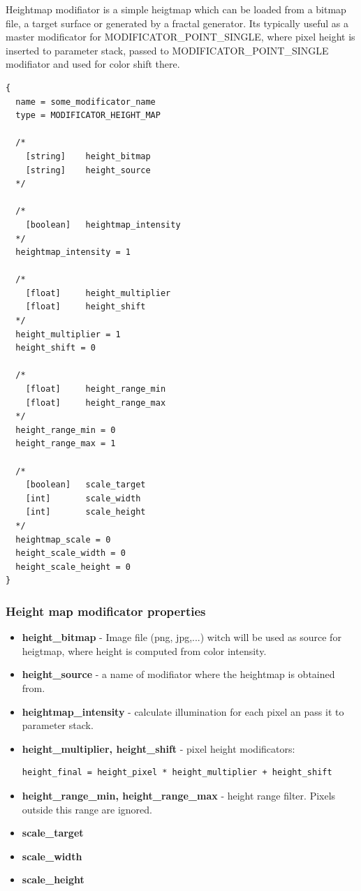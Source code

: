 \documentclass[9pt]{article}
\begin{document}
Heightmap modifiator is a simple heigtmap which can be loaded from a bitmap
file, a target surface or generated by a fractal generator. Its typically useful
as a master modificator for MODIFICATOR\_POINT\_SINGLE, where pixel height
is inserted to parameter stack, passed to MODIFICATOR\_POINT\_SINGLE modifiator
and used for color shift there.

\begin{verbatim}
{
  name = some_modificator_name
  type = MODIFICATOR_HEIGHT_MAP
  
  /*    
    [string]    height_bitmap
    [string]    height_source
  */
  
  /*
    [boolean]   heightmap_intensity
  */
  heightmap_intensity = 1
  
  /*    
    [float]     height_multiplier
    [float]     height_shift
  */
  height_multiplier = 1
  height_shift = 0
  
  /*
    [float]     height_range_min
    [float]     height_range_max
  */  
  height_range_min = 0
  height_range_max = 1
  
  /*  
    [boolean]   scale_target
    [int]       scale_width
    [int]       scale_height
  */
  heightmap_scale = 0
  height_scale_width = 0
  height_scale_height = 0
}
\end{verbatim}
\subsubsection*{Height map modificator properties}
\begin{itemize}
\item{\bf height\_bitmap} - Image file (png, jpg,...) witch will be used as 
source for heigtmap, where height is computed from color intensity.
\item{\bf height\_source} - a name of modifiator where the heightmap is obtained from.
\item{\bf heightmap\_intensity} - calculate illumination for each pixel an pass it
to parameter stack.
\item{\bf height\_multiplier, height\_shift} - pixel height modificators:
\begin{verbatim}
height_final = height_pixel * height_multiplier + height_shift
\end{verbatim}
\item{\bf height\_range\_min, height\_range\_max} - height range filter. Pixels
outside this range are ignored.
\item{\bf scale\_target}
\item{\bf scale\_width}
\item{\bf scale\_height}
\end{itemize}
\end{document}
